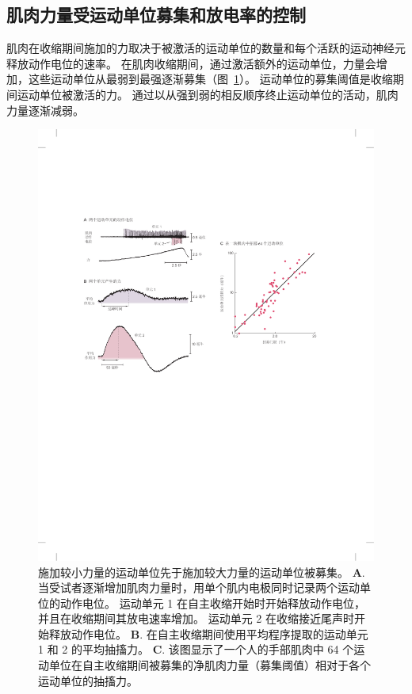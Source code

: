 \subsection{肌肉力量受运动单位募集和放电率的控制}

肌肉在收缩期间施加的力取决于被激活的运动单位的数量和每个活跃的运动神经元释放动作电位的速率。
在肌肉收缩期间，通过激活额外的运动单位，力量会增加，这些运动单位从最弱到最强逐渐募集（图~\ref{fig:31_5}）。
运动单位的募集阈值是收缩期间运动单位被激活的力。
通过以从强到弱的相反顺序终止运动单位的活动，肌肉力量逐渐减弱。


\begin{figure}[htbp]
	\centering
	\includegraphics[width=1.0\linewidth]{chap31/fig_31_5}
	\caption{施加较小力量的运动单位先于施加较大力量的运动单位被募集\cite{desmedt1977ballistic,milner1973orderly}。
	\textbf{A}.当受试者逐渐增加肌肉力量时，用单个肌内电极同时记录两个运动单位的动作电位。
	运动单元 1 在自主收缩开始时开始释放动作电位，并且在收缩期间其放电速率增加。
	运动单元 2 在收缩接近尾声时开始释放动作电位。
	\textbf{B}. 在自主收缩期间使用平均程序提取的运动单元 1 和 2 的平均抽搐力。
	\textbf{C}. 该图显示了一个人的手部肌肉中 64 个运动单位在自主收缩期间被募集的净肌肉力量（募集阈值）相对于各个运动单位的抽搐力。}
	\label{fig:31_5}
\end{figure}


